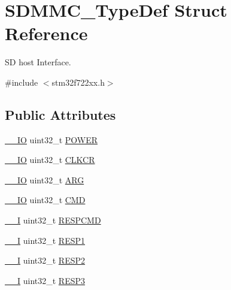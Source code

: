 \hypertarget{struct_s_d_m_m_c___type_def}{}\section{S\+D\+M\+M\+C\+\_\+\+Type\+Def Struct Reference}
\label{struct_s_d_m_m_c___type_def}


SD host Interface.  




{\ttfamily \#include $<$stm32f722xx.\+h$>$}

\subsection*{Public Attributes}
\begin{DoxyCompactItemize}
\item 
\mbox{\hyperlink{core__sc300_8h_aec43007d9998a0a0e01faede4133d6be}{\+\_\+\+\_\+\+IO}} uint32\+\_\+t \mbox{\hyperlink{struct_s_d_m_m_c___type_def_ab241f9bc57b5606c7cdad92a94130b5e}{P\+O\+W\+ER}}
\item 
\mbox{\hyperlink{core__sc300_8h_aec43007d9998a0a0e01faede4133d6be}{\+\_\+\+\_\+\+IO}} uint32\+\_\+t \mbox{\hyperlink{struct_s_d_m_m_c___type_def_ac432d7f247e2f199f387a9d81a70dbe3}{C\+L\+K\+CR}}
\item 
\mbox{\hyperlink{core__sc300_8h_aec43007d9998a0a0e01faede4133d6be}{\+\_\+\+\_\+\+IO}} uint32\+\_\+t \mbox{\hyperlink{struct_s_d_m_m_c___type_def_aa4a8ca4a55a6c1b0d2837bb1490efea6}{A\+RG}}
\item 
\mbox{\hyperlink{core__sc300_8h_aec43007d9998a0a0e01faede4133d6be}{\+\_\+\+\_\+\+IO}} uint32\+\_\+t \mbox{\hyperlink{struct_s_d_m_m_c___type_def_ad67342999b4fb5e7c7249935ea96d02f}{C\+MD}}
\item 
\mbox{\hyperlink{core__sc300_8h_af63697ed9952cc71e1225efe205f6cd3}{\+\_\+\+\_\+I}} uint32\+\_\+t \mbox{\hyperlink{struct_s_d_m_m_c___type_def_a33c78086429a7eed4d57a5633a9d78f2}{R\+E\+S\+P\+C\+MD}}
\item 
\mbox{\hyperlink{core__sc300_8h_af63697ed9952cc71e1225efe205f6cd3}{\+\_\+\+\_\+I}} uint32\+\_\+t \mbox{\hyperlink{struct_s_d_m_m_c___type_def_aca71c167ec5fbe3884109e0bd3fb51fb}{R\+E\+S\+P1}}
\item 
\mbox{\hyperlink{core__sc300_8h_af63697ed9952cc71e1225efe205f6cd3}{\+\_\+\+\_\+I}} uint32\+\_\+t \mbox{\hyperlink{struct_s_d_m_m_c___type_def_a3f1ab9eeca1d08e5fc50b6a8a0ee0257}{R\+E\+S\+P2}}
\item 
\mbox{\hyperlink{core__sc300_8h_af63697ed9952cc71e1225efe205f6cd3}{\+\_\+\+\_\+I}} uint32\+\_\+t \mbox{\hyperlink{struct_s_d_m_m_c___type_def_ae4a9250b0100c1a251354d64dde42300}{R\+E\+S\+P3}}

\end{DoxyCompactItemize}
